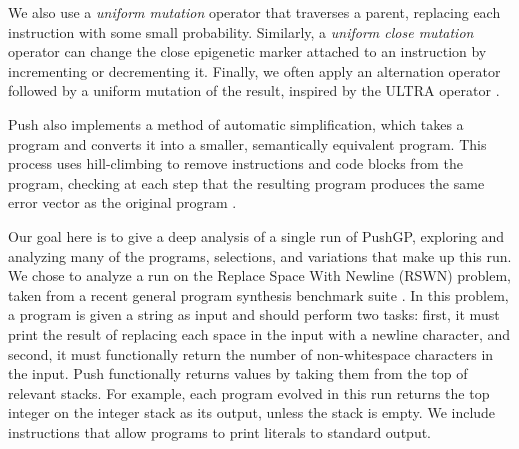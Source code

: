 We also use a \textit{uniform mutation} operator that traverses a parent, 
replacing each instruction with some small probability. Similarly, a 
\textit{uniform close mutation} operator can change the close epigenetic marker 
attached to an instruction by incrementing or decrementing it. Finally, we 
often apply an alternation operator followed by a uniform mutation of the 
result, inspired by the ULTRA operator \citep{Spector:2013:GPTP}.

Push also implements a method of automatic simplification, which takes a program and 
converts it into a smaller, semantically equivalent program. This process uses 
hill-climbing to remove instructions and code blocks from the program, checking 
at each step that the resulting program produces the same error vector as the 
original program \citep{Spector:2014:GECCOcomp}.

Our goal here is to give a deep analysis of a single run of PushGP, exploring and analyzing many of the programs, selections, and variations that make up this run. We chose to analyze a run on the Replace Space With Newline (RSWN) problem, taken from a recent general program synthesis benchmark suite \citep{Helmuth:2015:GECCO}. In this problem, a program is given a string as input and should perform two tasks: first, it must print the result of replacing each space in the input with a newline character, and second, it must functionally return the number of non-whitespace characters in the input. Push functionally returns values by taking them from the top of relevant stacks. For example, each program evolved in this run returns the top integer on the integer stack as its output, unless the stack is empty. We include instructions that allow programs to print literals to standard output.





